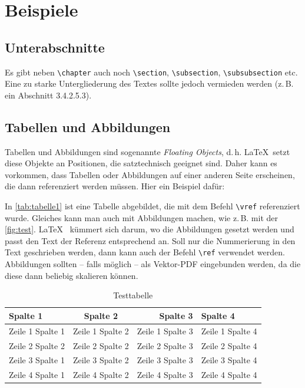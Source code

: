 \section{Beispiele}
\lipsum[1]

\subsection{Unterabschnitte}
Es gibt neben \texttt{\textbackslash chapter} auch noch  \texttt{\textbackslash section}, \texttt{\textbackslash subsection}, \texttt{\textbackslash subsubsection} etc. Eine zu starke Untergliederung des Textes sollte jedoch vermieden werden (z.\,B. ein Abschnitt 3.4.2.5.3). 

\subsection{Tabellen und Abbildungen}
Tabellen und Abbildungen sind sogenannte \textit{Floating Objects}, d.\,h. \LaTeX\ setzt diese Objekte an Positionen, die satztechnisch geeignet sind. Daher kann es vorkommen, dass Tabellen oder Abbildungen auf einer anderen Seite erscheinen, die dann referenziert werden müssen. Hier ein Beispiel dafür: 

In \autoref{tab:tabelle1} ist eine Tabelle abgebildet, die mit dem Befehl \texttt{\textbackslash vref} referenziert wurde. Gleiches kann man auch mit Abbildungen 
machen, wie z.\,B. mit der \autoref{fig:test}. \LaTeX~ kümmert sich darum, wo die Abbildungen gesetzt werden und passt den Text der Referenz entsprechend an. Soll nur die Nummerierung in den Text geschrieben werden, dann kann auch der Befehl \texttt{\textbackslash ref} verwendet werden.
Abbildungen sollten -- falls möglich -- als Vektor-PDF eingebunden 
werden, da die diese dann beliebig skalieren können.


\begin{table}[h!]
	\centering
	\begin{tabular}{p{3cm}crl}
		\textbf{Spalte 1} & \textbf{Spalte 2} & \textbf{Spalte 3} & \textbf{Spalte 4}\\\toprule
		Zeile 1 Spalte 1 &  Zeile 1 Spalte 2 & Zeile 1 Spalte 3 & Zeile 1 Spalte 4\\
		Zeile 2 Spalte 2 &  Zeile 2 Spalte 2 & Zeile 2 Spalte 3 & Zeile 2 Spalte 4\\\midrule
		Zeile 3 Spalte 1 &  Zeile 3 Spalte 2 & Zeile 3 Spalte 3 & Zeile 3 Spalte 4\\
		Zeile 4 Spalte 1 &  Zeile 4 Spalte 2 & Zeile 4 Spalte 3 & Zeile 4 Spalte 4\\\bottomrule
	\end{tabular}
	\caption[Testtabelle]{\label{tab:tabelle1}Testtabelle}
\end{table}

